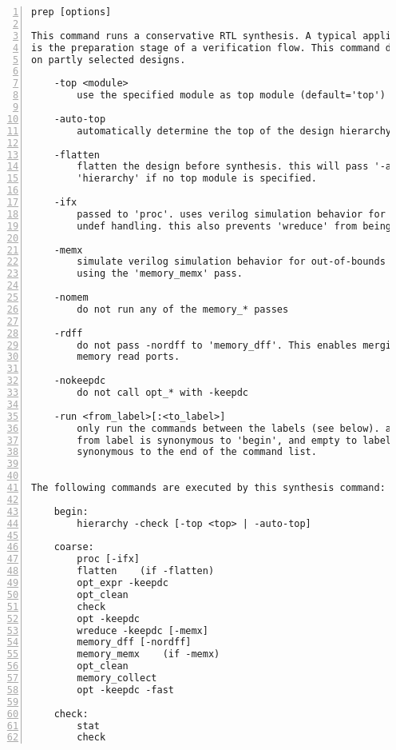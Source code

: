 \begin{lstlisting}[numbers=left,frame=single]
    prep [options]

This command runs a conservative RTL synthesis. A typical application for this
is the preparation stage of a verification flow. This command does not operate
on partly selected designs.

    -top <module>
        use the specified module as top module (default='top')

    -auto-top
        automatically determine the top of the design hierarchy

    -flatten
        flatten the design before synthesis. this will pass '-auto-top' to
        'hierarchy' if no top module is specified.

    -ifx
        passed to 'proc'. uses verilog simulation behavior for verilog if/case
        undef handling. this also prevents 'wreduce' from being run.

    -memx
        simulate verilog simulation behavior for out-of-bounds memory accesses
        using the 'memory_memx' pass.

    -nomem
        do not run any of the memory_* passes

    -rdff
        do not pass -nordff to 'memory_dff'. This enables merging of FFs into
        memory read ports.

    -nokeepdc
        do not call opt_* with -keepdc

    -run <from_label>[:<to_label>]
        only run the commands between the labels (see below). an empty
        from label is synonymous to 'begin', and empty to label is
        synonymous to the end of the command list.


The following commands are executed by this synthesis command:

    begin:
        hierarchy -check [-top <top> | -auto-top]

    coarse:
        proc [-ifx]
        flatten    (if -flatten)
        opt_expr -keepdc
        opt_clean
        check
        opt -keepdc
        wreduce -keepdc [-memx]
        memory_dff [-nordff]
        memory_memx    (if -memx)
        opt_clean
        memory_collect
        opt -keepdc -fast

    check:
        stat
        check
\end{lstlisting}

